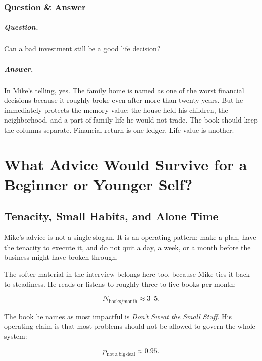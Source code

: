 \documentclass[11pt,oneside]{book}
\begin{document}
\subsection{Question \& Answer}

\paragraph{Question.}
Can a bad investment still be a good life decision?

\paragraph{Answer.}
In Mike's telling, yes. The family home is named as one of the worst financial decisions because it roughly broke even after more than twenty years. But he immediately protects the memory value: the house held his children, the neighborhood, and a part of family life he would not trade. The book should keep the columns separate. Financial return is one ledger. Life value is another.

\chapter{What Advice Would Survive for a Beginner or Younger Self?}

\section{Tenacity, Small Habits, and Alone Time}

Mike's advice is not a single slogan. It is an operating pattern: make a plan, have the tenacity to execute it, and do not quit a day, a week, or a month before the business might have broken through.

The softer material in the interview belongs here too, because Mike ties it back to steadiness. He reads or listens to roughly three to five books per month:

\begin{equation}
N_{\mathrm{books/month}}\approx 3\text{--}5.
\end{equation}

The book he names as most impactful is \emph{Don't Sweat the Small Stuff}. His operating claim is that most problems should not be allowed to govern the whole system:

\begin{equation}
p_{\mathrm{not\ a\ big\ deal}}\approx 0.95.
\end{equation}
\end{document}
